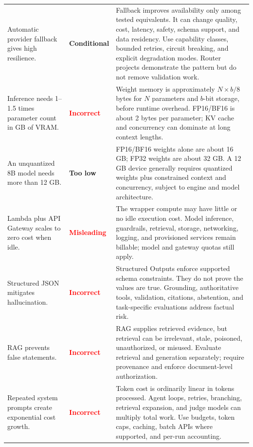 \documentclass[10pt]{article}
\newcommand{\verdict}[2]{\textcolor{#1}{\sffamily\bfseries #2}}
\begin{document}
\begin{longtable}{P{0.27\textwidth} P{0.12\textwidth} P{0.53\textwidth}}
\addlinespace
Automatic provider fallback gives high resilience. & \verdict{amber}{Conditional} & Fallback improves availability only among tested equivalents. It can change quality, cost, latency, safety, schema support, and data residency. Use capability classes, bounded retries, circuit breaking, and explicit degradation modes. Router projects demonstrate the pattern but do not remove validation work.\cite{litellm-router} \\
\addlinespace
Inference needs 1--1.5 times parameter count in GB of VRAM. & \verdict{red}{Incorrect} & Weight memory is approximately \(N \times b / 8\) bytes for \(N\) parameters and \(b\)-bit storage, before runtime overhead. FP16/BF16 is about 2 bytes per parameter; KV cache and concurrency can dominate at long context lengths.\cite{hf-memory,vllm-opt} \\
\addlinespace
An unquantized 8B model needs more than 12 GB. & \verdict{amber}{Too low} & FP16/BF16 weights alone are about 16 GB; FP32 weights are about 32 GB. A 12 GB device generally requires quantized weights plus constrained context and concurrency, subject to engine and model architecture. \\
\addlinespace
Lambda plus API Gateway scales to zero cost when idle. & \verdict{red}{Misleading} & The wrapper compute may have little or no idle execution cost. Model inference, guardrails, retrieval, storage, networking, logging, and provisioned services remain billable; model and gateway quotas still apply.\cite{bedrock-pricing,bedrock-quotas,api-gateway-quotas} \\
\addlinespace
Structured JSON mitigates hallucination. & \verdict{red}{Incorrect} & Structured Outputs enforce supported schema constraints. They do not prove the values are true. Grounding, authoritative tools, validation, citations, abstention, and task-specific evaluations address factual risk.\cite{openai-structured,nist-genai} \\
\addlinespace
RAG prevents false statements. & \verdict{red}{Incorrect} & RAG supplies retrieved evidence, but retrieval can be irrelevant, stale, poisoned, unauthorized, or misused. Evaluate retrieval and generation separately; require provenance and enforce document-level authorization.\cite{nist-genai,owasp-top10} \\
\addlinespace
Repeated system prompts create exponential cost growth. & \verdict{red}{Incorrect} & Token cost is ordinarily linear in tokens processed. Agent loops, retries, branching, retrieval expansion, and judge models can multiply total work. Use budgets, token caps, caching, batch APIs where supported, and per-run accounting.\cite{openai-cache,openai-batch} \\

\end{longtable}
\end{document}
